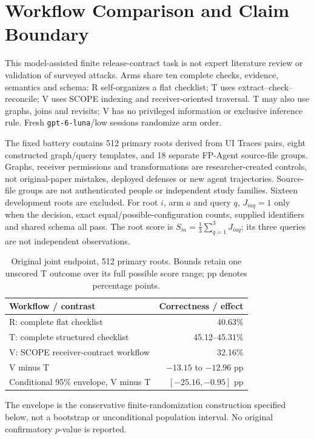 \section{Workflow Comparison and Claim Boundary}
\label{app:scope-workflow-boundary}
This model-assisted finite release-contract task is not expert literature review or validation of surveyed attacks. Arms share ten complete checks, evidence, semantics and schema: R self-organizes a flat checklist; T uses extract--check--reconcile; V uses SCOPE indexing and receiver-oriented traversal. T may also use graphs, joins and revisits; V has no privileged information or exclusive inference rule. Fresh \texttt{gpt-6-luna}/low sessions randomize arm order.

The fixed battery contains 512 primary roots derived from UI Traces pairs, eight constructed graph/query templates, and 18 separate FP-Agent source-file groups. Graphs, receiver permissions and transformations are researcher-created controls, not original-paper mistakes, deployed defenses or new agent trajectories. Source-file groups are not authenticated people or independent study families. Sixteen development roots are excluded. For root $i$, arm $a$ and query $q$, $J_{iaq}=1$ only when the decision, exact equal/possible-configuration counts, supplied identifiers and shared schema all pass. The root score is $S_{ia}=\frac13\sum_{q=1}^3 J_{iaq}$; its three queries are not independent observations.

\begin{table}[htbp]
\centering\footnotesize
\caption{Original joint endpoint, 512 primary roots. Bounds retain one unscored T outcome over its full possible score range; pp denotes percentage points.}
\label{tab:scope-workflow-boundary}
\begin{tabularx}{\columnwidth}{@{}Y r@{}}
\toprule Workflow / contrast & Correctness / effect \\
\midrule
R: complete flat checklist & 40.63\% \\
T: complete structured checklist & 45.12--45.31\% \\
V: SCOPE receiver-contract workflow & 32.16\% \\
V minus T & $-13.15$ to $-12.96$ pp \\
Conditional 95\% envelope, V minus T & $[-25.16,-0.95]$ pp \\
\bottomrule
\end{tabularx}
\par\smallskip\raggedright\footnotesize
The envelope is the conservative finite-randomization construction specified below, not a bootstrap or unconditional population interval. No original confirmatory $p$-value is reported.
\end{table}

